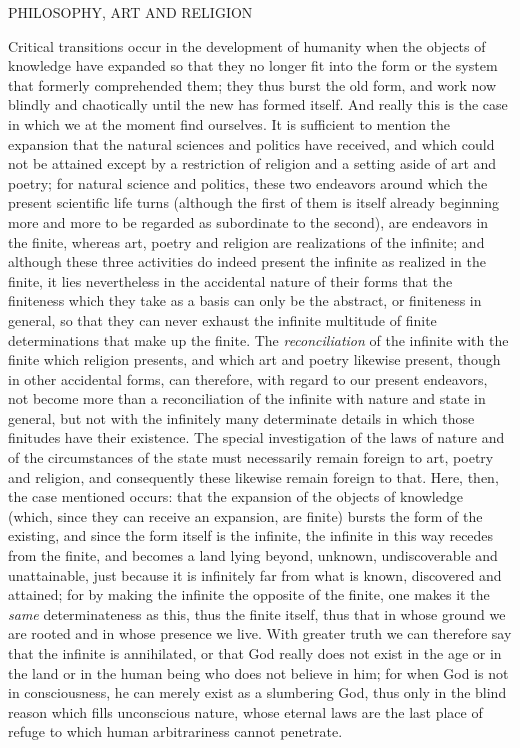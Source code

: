 \documentclass[12pt,a4paper,openany]{book}
\newcommand{\opage}[1]{\marginnote{\footnotesize\textit{[#1]}}}
\newcommand{\excerpthead}[1]{\par\bigskip\begin{center}#1\end{center}\nopagebreak\smallskip}
\begin{document}
\excerpthead{PHILOSOPHY, ART AND RELIGION}


Critical transitions occur in the development of humanity when the objects of
knowledge have expanded so that they no longer fit into the form or the system that
formerly comprehended them; they thus burst the old form, and work now blindly and
chaotically until the new has formed itself. And really this is the case in which we
at the moment find ourselves. It is sufficient to mention the expansion that
\setcounter{footnote}{0}%
\opage{147}the natural sciences and politics have received, and which could not be attained
except by a restriction of religion and a setting aside of art and poetry; for
natural science and politics, these two endeavors around which the present scientific
life turns (although the first of them is itself already beginning more and more to
be regarded as subordinate to the second), are endeavors in the finite, whereas art,
poetry and religion are realizations of the infinite; and although these three
activities do indeed present the infinite as realized in the finite, it lies
nevertheless in the accidental nature of their forms that the finiteness which they
take as a basis can only be the abstract, or finiteness in general, so that they can
never exhaust the infinite multitude of finite determinations that make up the
finite. The \emph{reconciliation} of the infinite with the finite which religion
presents, and which art and poetry likewise present, though in other accidental
forms, can therefore, with regard to our present endeavors, not become more than a
reconciliation of the infinite with nature and state in general, but not with the
infinitely many determinate details in which those finitudes have their existence.
The special investigation of the laws of nature and of the circumstances of the state
must necessarily remain foreign to art, poetry and religion, and consequently these
likewise remain foreign to that. Here, then, the case mentioned occurs: that the
expansion of the objects of knowledge (which, since they can receive an expansion,
are finite) bursts the form of the existing, and since the form itself is the
infinite, the infinite in this way recedes from the finite, and becomes a land lying
beyond, unknown, undiscoverable and unattainable, just because it is infinitely far
from what is known, discovered and attained; for by making the infinite the opposite
of the finite, one makes it the \emph{same} determinateness as this, thus the finite
itself, thus that in whose ground we are rooted and in whose
\setcounter{footnote}{0}%
\opage{148}presence we live. With greater truth we can therefore say that the infinite is
annihilated, or that God really does not exist in the age or in the land or in the
human being who does not believe in him; for when God is not in consciousness, he can
merely exist as a slumbering God, thus only in the blind reason which fills
unconscious nature, whose eternal laws are the last place of refuge to which human
arbitrariness cannot penetrate.
\end{document}
